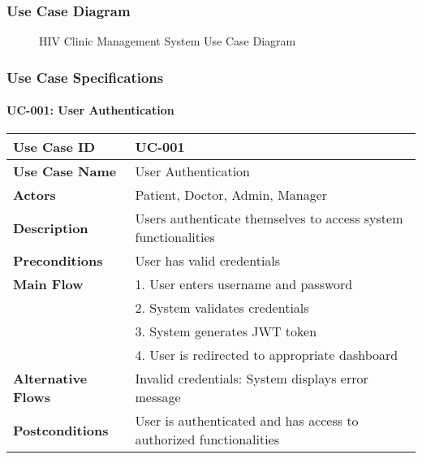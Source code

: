 \documentclass[12pt,a4paper]{article}
\begin{document}
\subsubsection{Use Case Diagram}

\begin{figure}[H]
\centering
{}
\caption{HIV Clinic Management System Use Case Diagram}
\label{fig:use-case-diagram}
\end{figure}

\subsubsection{Use Case Specifications}

\paragraph{UC-001: User Authentication}
\begin{longtable}{|p{3cm}|p{11cm}|}
\hline
\textbf{Use Case ID} & UC-001 \\
\hline
\textbf{Use Case Name} & User Authentication \\
\hline
\textbf{Actors} & Patient, Doctor, Admin, Manager \\
\hline
\textbf{Description} & Users authenticate themselves to access system functionalities \\
\hline
\textbf{Preconditions} & User has valid credentials \\
\hline
\textbf{Main Flow} & 1. User enters username and password\\
& 2. System validates credentials\\
& 3. System generates JWT token\\
& 4. User is redirected to appropriate dashboard \\
\hline
\textbf{Alternative Flows} & Invalid credentials: System displays error message \\
\hline
\textbf{Postconditions} & User is authenticated and has access to authorized functionalities \\
\hline
\end{longtable}
\end{document}
